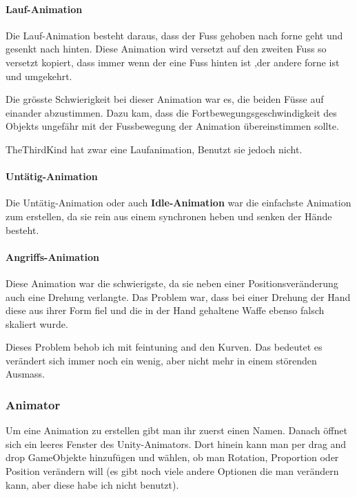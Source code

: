 \paragraph{Lauf-Animation}

Die Lauf-Animation besteht daraus, dass der Fuss gehoben nach forne geht und gesenkt nach hinten. Diese Animation wird versetzt auf den zweiten Fuss so versetzt kopiert, dass immer wenn der eine Fuss hinten ist ,der andere forne ist und umgekehrt.

Die grösste Schwierigkeit bei dieser Animation war es, die beiden Füsse auf einander abzustimmen.
Dazu kam, dass die Fortbewegungsgeschwindigkeit des Objekts ungefähr mit der Fussbewegung der Animation übereinstimmen sollte.

TheThirdKind hat zwar eine Laufanimation, Benutzt sie jedoch nicht.
\paragraph{Untätig-Animation}
Die Untätig-Animation oder auch \textbf{Idle-Animation} war die einfachste Animation zum erstellen, da sie rein aus einem synchronen heben und senken der Hände besteht.

\paragraph{Angriffs-Animation}

Diese Animation war die schwierigste, da sie neben einer Positionsveränderung auch eine Drehung verlangte.
Das Problem war, dass bei einer Drehung der Hand diese aus ihrer Form fiel und die in der Hand gehaltene Waffe ebenso falsch skaliert wurde.

Dieses Problem behob ich mit feintuning and den Kurven.
Das bedeutet es verändert sich immer noch ein wenig, aber nicht mehr in einem störenden Ausmass.

\subsubsection{Animator}
Um eine Animation zu erstellen gibt man ihr zuerst einen Namen.
Danach öffnet sich ein leeres Fenster des Unity-Animators.
Dort hinein kann man per drag and drop GameObjekte hinzufügen und wählen, ob man Rotation, Proportion oder Position verändern will (es gibt noch viele andere Optionen die man verändern 
kann, aber diese habe ich nicht benutzt).



